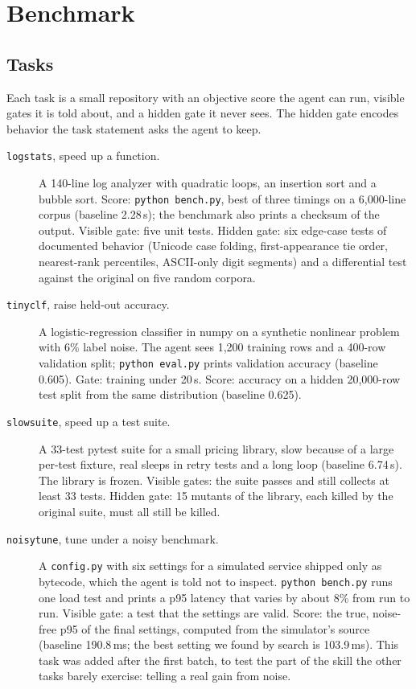 \section{Benchmark}
\label{sec:bench}

\subsection{Tasks}
Each task is a small repository with an objective score the agent can run, visible gates it is told about,
and a hidden gate it never sees. The hidden gate encodes behavior the task statement asks the agent to keep.

\begin{description}
\item[\texttt{logstats}, speed up a function.] A 140-line log analyzer with quadratic loops, an insertion
  sort and a bubble sort. Score: \texttt{python bench.py}, best of three timings on a 6{,}000-line corpus
  (baseline 2.28\,s); the benchmark also prints a checksum of the output. Visible gate: five unit tests.
  Hidden gate: six edge-case tests of documented behavior (Unicode case folding, first-appearance tie order,
  nearest-rank percentiles, ASCII-only digit segments) and a differential test against the original on five
  random corpora.
\item[\texttt{tinyclf}, raise held-out accuracy.] A logistic-regression classifier in numpy on a synthetic
  nonlinear problem with 6\% label noise. The agent sees 1{,}200 training rows and a 400-row validation split;
  \texttt{python eval.py} prints validation accuracy (baseline 0.605). Gate: training under 20\,s. Score: accuracy
  on a hidden 20{,}000-row test split from the same distribution (baseline 0.625).
\item[\texttt{slowsuite}, speed up a test suite.] A 33-test pytest suite for a small pricing library, slow
  because of a large per-test fixture, real sleeps in retry tests and a long loop (baseline 6.74\,s). The library
  is frozen. Visible gates: the suite passes and still collects at least 33 tests. Hidden gate: 15 mutants of the
  library, each killed by the original suite, must all still be killed.
\item[\texttt{noisytune}, tune under a noisy benchmark.] A \texttt{config.py} with six settings for a simulated
  service shipped only as bytecode, which the agent is told not to inspect. \texttt{python bench.py} runs one load
  test and prints a p95 latency that varies by about 8\% from run to run. Visible gate: a test that the settings
  are valid. Score: the true, noise-free p95 of the final settings, computed from the simulator's source
  (baseline 190.8\,ms; the best setting we found by search is 103.9\,ms). This task was added after the first
  batch, to test the part of the skill the other tasks barely exercise: telling a real gain from noise.
\end{description}

